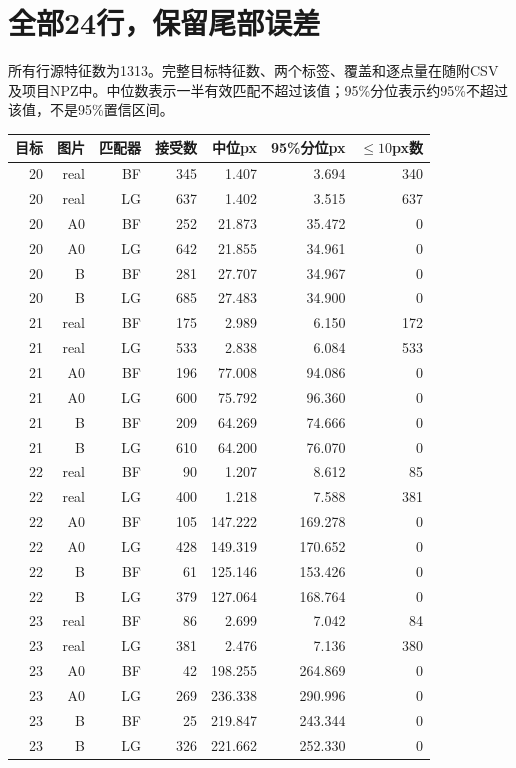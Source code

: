 \documentclass[UTF8,11pt,a4paper]{ctexart}
\begin{document}
\section{全部24行，保留尾部误差}
所有行源特征数为1313。完整目标特征数、两个标签、覆盖和逐点量在随附CSV及项目NPZ中。中位数表示一半有效匹配不超过该值；95\%分位表示约95\%不超过该值，不是95\%置信区间。
\small
\begin{longtable}{rrrrrrr}
\toprule 目标 & 图片 & 匹配器 & 接受数 & 中位px & 95\%分位px & $\le10$px数\\\midrule\endhead
20 & real & BF & 345 & 1.407 & 3.694 & 340 \\
20 & real & LG & 637 & 1.402 & 3.515 & 637 \\
20 & A0 & BF & 252 & 21.873 & 35.472 & 0 \\
20 & A0 & LG & 642 & 21.855 & 34.961 & 0 \\
20 & B & BF & 281 & 27.707 & 34.967 & 0 \\
20 & B & LG & 685 & 27.483 & 34.900 & 0 \\
21 & real & BF & 175 & 2.989 & 6.150 & 172 \\
21 & real & LG & 533 & 2.838 & 6.084 & 533 \\
21 & A0 & BF & 196 & 77.008 & 94.086 & 0 \\
21 & A0 & LG & 600 & 75.792 & 96.360 & 0 \\
21 & B & BF & 209 & 64.269 & 74.666 & 0 \\
21 & B & LG & 610 & 64.200 & 76.070 & 0 \\
22 & real & BF & 90 & 1.207 & 8.612 & 85 \\
22 & real & LG & 400 & 1.218 & 7.588 & 381 \\
22 & A0 & BF & 105 & 147.222 & 169.278 & 0 \\
22 & A0 & LG & 428 & 149.319 & 170.652 & 0 \\
22 & B & BF & 61 & 125.146 & 153.426 & 0 \\
22 & B & LG & 379 & 127.064 & 168.764 & 0 \\
23 & real & BF & 86 & 2.699 & 7.042 & 84 \\
23 & real & LG & 381 & 2.476 & 7.136 & 380 \\
23 & A0 & BF & 42 & 198.255 & 264.869 & 0 \\
23 & A0 & LG & 269 & 236.338 & 290.996 & 0 \\
23 & B & BF & 25 & 219.847 & 243.344 & 0 \\
23 & B & LG & 326 & 221.662 & 252.330 & 0 \\
\bottomrule\end{longtable}\normalsize
\clearpage
\end{document}
